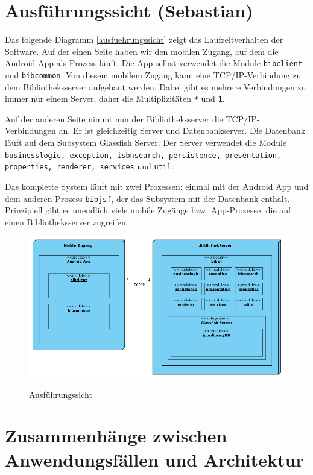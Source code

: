\documentclass[fontsize=12pt,paper=a4,twoside]{scrartcl}
\begin{document}
\section{Ausführungssicht (Sebastian)}

Das folgende Diagramm \vref{ausfuehrungssicht} zeigt das Laufzeitverhalten der Software.
Auf der einen Seite haben wir den mobilen Zugang, auf dem die Android App als Prozess läuft. Die App selbst verwendet die Module \texttt{bibclient} und \texttt{bibcommon}. Von diesem mobilem Zugang kann eine TCP/IP-Verbindung zu dem Bibliotheksserver aufgebaut werden. Dabei gibt es mehrere Verbindungen zu immer nur einem Server, daher die Multiplizitäten \texttt{*} und \texttt{1}.

Auf der anderen Seite nimmt nun der Bibliotheksserver die TCP/IP-Verbindungen an. Er ist gleichzeitig Server und Datenbankserver. Die Datenbank läuft auf dem Subsystem Glassfish Server. Der Server verwendet die Module \texttt{businesslogic, exception, isbnsearch, persistence, presentation, properties, renderer, services} und \texttt{util}.

Das komplette System läuft mit zwei Prozessen: einmal mit der Android App und dem anderen Prozess \texttt{bibjsf}, der das Subsystem mit der Datenbank enthält. Prinzipiell gibt es unendlich viele mobile Zugänge bzw. App-Prozesse, die auf einen Bibliotheksserver zugreifen.

\begin{figure} [H] 
\caption{Ausführungssicht} 
	\includegraphics[width=1\textwidth]{Diagramme/ausfuehrungssicht.png} 
	\label{ausfuehrungssicht} 
\end{figure}
\label{sec:ausfuehrung}

\section{Zusammenhänge zwischen Anwendungsfällen und Architektur}
\label{sec:anwendungsfaelle}
\end{document}
